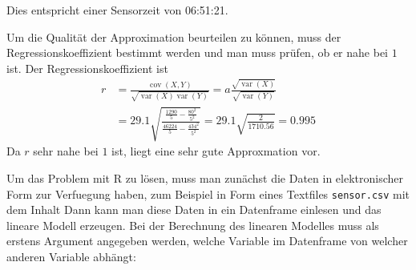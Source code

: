 \begin{loesung}
\begin{teilaufgaben}
Dies entspricht einer Sensorzeit von 06:51:21.
\item
Um die Qualität der Approximation beurteilen zu können, muss
der Regressionskoeffizient bestimmt werden und man muss prüfen,
ob er nahe bei $1$ ist. Der Regressionskoeffizient ist
\begin{align*}
r&=\frac{\operatorname{cov}(X,Y)}{\sqrt{\operatorname{var}(X)\operatorname{var}(Y)}}
=a\frac{\sqrt{\operatorname{var}(X)}}{\sqrt{\operatorname{var}(Y)}}
\\
&=
29.1 \sqrt{\frac{\frac{1290}{5}-\frac{80^2}{5^2}}{\frac{46224}{5}-\frac{434^2}{5^2}}}
=29.1 \sqrt{\frac{2}{1710.56}}= 0.995
\end{align*}
Da $r$ sehr nahe bei $1$ ist, liegt eine sehr gute Approxmation vor.
\item
Um das Problem mit R zu lösen, muss man zunächst die Daten in
elektronischer Form zur Verfuegung haben, zum Beispiel in Form
eines Textfiles {\tt sensor.csv} mit dem Inhalt
Dann kann man diese Daten in ein Datenframe einlesen und das lineare
Modell erzeugen. Bei der Berechnung des linearen Modelles muss als
erstens Argument angegeben werden, welche Variable im Datenframe von
welcher anderen Variable abhängt:
\qedhere
\end{teilaufgaben}
\end{loesung}

